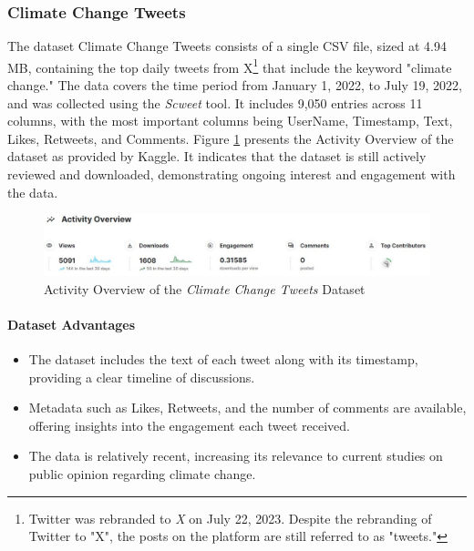 \subsubsection{Climate Change Tweets}

The dataset Climate Change Tweets \cite{ClimateChangeTweets} consists of a single CSV file, sized at 4.94 MB, containing the top daily tweets from X\footnote{Twitter was rebranded to \emph{X} on July 22, 2023. Despite the rebranding of Twitter to "X", the posts on the platform are still referred to as "tweets."} that include the keyword "climate change." The data covers the time period from January 1, 2022, to July 19, 2022, and was collected using the \emph{Scweet} tool. It includes 9,050 entries across 11 columns, with the most important columns being UserName, Timestamp, Text, Likes, Retweets, and Comments. Figure \ref{fig:ds_1_activity} presents the Activity Overview of the dataset as provided by Kaggle. It indicates that the dataset is still actively reviewed and downloaded, demonstrating ongoing interest and engagement with the data. 

\begin{figure}[h]
    \includegraphics[width=\textwidth]{images/dataset/ds_1_activity.JPG}
    \caption{Activity Overview of the \emph{Climate Change Tweets} Dataset\protect\footnotemark}
    \label{fig:ds_1_activity}
\end{figure}

\paragraph{Dataset Advantages}
\begin{itemize}
    \item The dataset includes the text of each tweet along with its timestamp, providing a clear timeline of discussions.
    \item Metadata such as Likes, Retweets, and the number of comments are available, offering insights into the engagement each tweet received.
    \item The data is relatively recent, increasing its relevance to current studies on public opinion regarding climate change.
\end{itemize}

